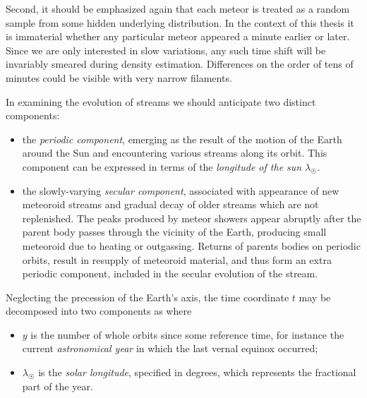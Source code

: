             Second, it should be emphasized again that each meteor is treated
            as a random sample from some hidden underlying distribution.
            In the context of this thesis it is immaterial whether any particular meteor
            appeared a minute earlier or later. Since we are only interested in slow variations,
            any such time shift will be invariably smeared during density estimation.
            Differences on the order of tens of minutes could be visible with very narrow filaments.

            In examining the evolution of streams we should anticipate two distinct components:
            \begin{itemize}
                \item the \emph{periodic component}, emerging as the result of the motion of the Earth
                    around the Sun and encountering various streams along its orbit.
                    This component can be expressed in terms of the \emph{longitude of the sun} $\lambda_\Sun$.

                \item the slowly-varying \emph{secular component}, associated with appearance of new meteoroid
                    streams and gradual decay of older streams which are not replenished.
                    The peaks produced by meteor showers appear abruptly after the parent body passes through the vicinity of the Earth,
                    producing small meteoroid due to heating or outgassing.
                    Returns of parents bodies on periodic orbits, result in resupply of meteoroid material,
                    and thus form an extra periodic component, included in the secular evolution of the stream.
            \end{itemize}

            Neglecting the precession of the Earth's axis, the time coordinate $t$ may be decomposed into two components as
            where
            \begin{itemize}
                \item $y$ is the number of whole orbits since some reference time, for instance
                    the current \emph{astronomical year} in which the last vernal equinox occurred;
                \item $\lambda_\Sun$ is the \emph{solar longitude}, specified in degrees, which represents the fractional part of the year.
            \end{itemize}

